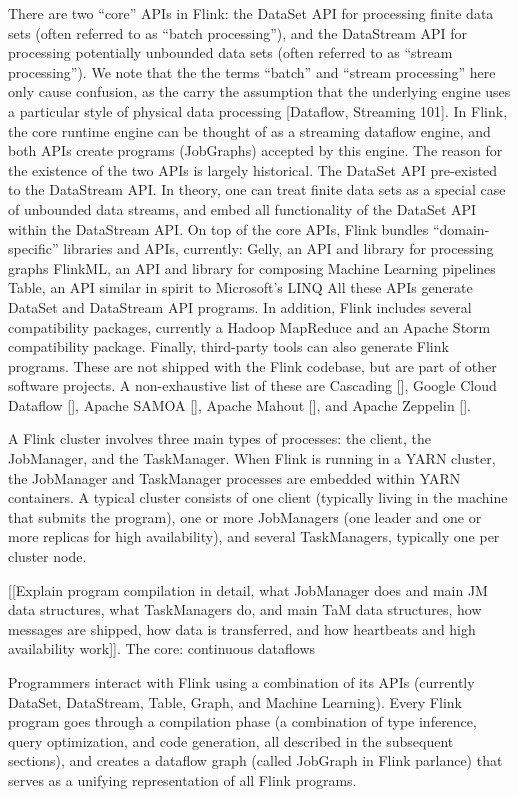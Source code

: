 \documentclass{sig-alternate}
\begin{document}
There are two “core” APIs in Flink: the DataSet API for processing finite data sets (often referred to as “batch processing”), and the DataStream API for processing potentially unbounded data sets (often referred to as “stream processing”). We note that the the terms “batch” and “stream processing” here only cause confusion, as the carry the assumption that the underlying engine uses a particular style of physical data processing [Dataflow, Streaming 101]. In Flink, the core runtime engine can be thought of as a streaming dataflow engine, and both APIs create programs (JobGraphs) accepted by this engine. The reason for the existence of the two APIs is largely historical. The DataSet API pre-existed to the DataStream API. In theory, one can treat finite data sets as a special case of unbounded data streams, and embed all functionality of the DataSet API within the DataStream API. 
On top of the core APIs, Flink bundles “domain-specific” libraries and APIs, currently:
Gelly, an API and library for processing graphs
FlinkML, an API and library for composing Machine Learning pipelines
Table, an API similar in spirit to Microsoft’s LINQ
All these APIs generate DataSet and DataStream API programs. In addition, Flink includes several compatibility packages, currently a Hadoop MapReduce and an Apache Storm compatibility package. Finally, third-party tools can also generate Flink programs. These are not shipped with the Flink codebase, but are part of other software projects. A non-exhaustive list of these are Cascading [], Google Cloud Dataflow [], Apache SAMOA [], Apache Mahout [], and Apache Zeppelin [].

A Flink cluster involves three main types of processes: the client, the JobManager, and the TaskManager. When Flink is running in a YARN cluster, the JobManager and TaskManager processes are embedded within YARN containers. A typical cluster consists of one client (typically living in the machine that submits the program), one or more JobManagers (one leader and one or more replicas for high availability), and several TaskManagers, typically one per cluster node. 

[[Explain program compilation in detail, what JobManager does and main JM data structures, what TaskManagers do, and main TaM data structures, how messages are shipped, how data is transferred, and how heartbeats and high availability work]].
The core: continuous dataflows 

Programmers interact with Flink using a combination of its APIs (currently DataSet, DataStream, Table, Graph, and Machine Learning). Every Flink program goes through a compilation phase (a combination of type inference, query optimization, and code generation, all described in the subsequent sections), and creates a dataflow graph (called JobGraph in Flink parlance) that serves as a unifying representation of all Flink programs.
\end{document}
